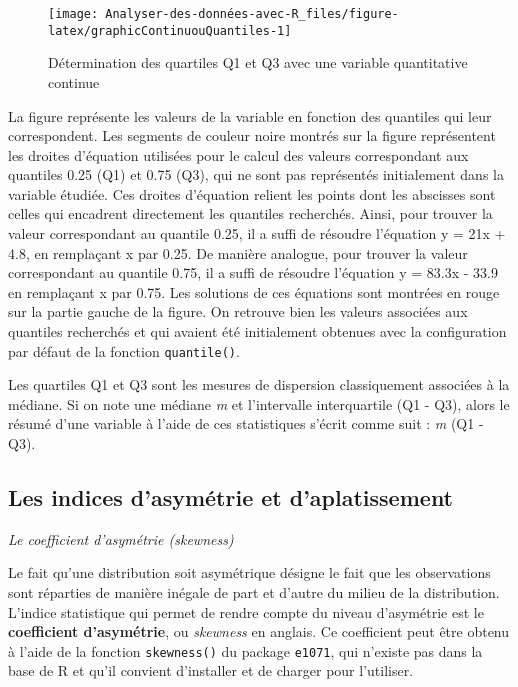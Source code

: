 \documentclass[
  french,
]{book}
\begin{document}
\begin{figure}

{\centering \texttt{[image: Analyser-des-données-avec-R\_files/figure-latex/graphicContinuouQuantiles-1]} 

}

\caption{Détermination des quartiles Q1 et Q3 avec une variable quantitative continue}\label{fig:graphicContinuouQuantiles}
\end{figure}

La figure représente les valeurs de la variable en fonction des quantiles qui leur correspondent. Les segments de couleur noire montrés sur la figure représentent les droites d'équation utilisées pour le calcul des valeurs correspondant aux quantiles 0.25 (Q1) et 0.75 (Q3), qui ne sont pas représentés initialement dans la variable étudiée. Ces droites d'équation relient les points dont les abscisses sont celles qui encadrent directement les quantiles recherchés. Ainsi, pour trouver la valeur correspondant au quantile 0.25, il a suffi de résoudre l'équation y = 21x + 4.8, en remplaçant x par 0.25. De manière analogue, pour trouver la valeur correspondant au quantile 0.75, il a suffi de résoudre l'équation y = 83.3x - 33.9 en remplaçant x par 0.75. Les solutions de ces équations sont montrées en rouge sur la partie gauche de la figure. On retrouve bien les valeurs associées aux quantiles recherchés et qui avaient été initialement obtenues avec la configuration par défaut de la fonction \texttt{quantile()}.

Les quartiles Q1 et Q3 sont les mesures de dispersion classiquement associées à la médiane. Si on note une médiane \emph{m} et l'intervalle interquartile (Q1 - Q3), alors le résumé d'une variable à l'aide de ces statistiques s'écrit comme suit : \emph{m} (Q1 - Q3).

\hypertarget{les-indices-dasymuxe9trie-et-daplatissement}{%
\subsection{Les indices d'asymétrie et d'aplatissement}\label{les-indices-dasymuxe9trie-et-daplatissement}}

\emph{Le coefficient d'asymétrie (skewness)}

Le fait qu'une distribution soit asymétrique désigne le fait que les observations sont réparties de manière inégale de part et d'autre du milieu de la distribution. L'indice statistique qui permet de rendre compte du niveau d'asymétrie est le \textbf{coefficient d'asymétrie}, ou \emph{skewness} en anglais. Ce coefficient peut être obtenu à l'aide de la fonction \texttt{skewness()} du package \texttt{e1071}, qui n'existe pas dans la base de R et qu'il convient d'installer et de charger pour l'utiliser.
\end{document}
